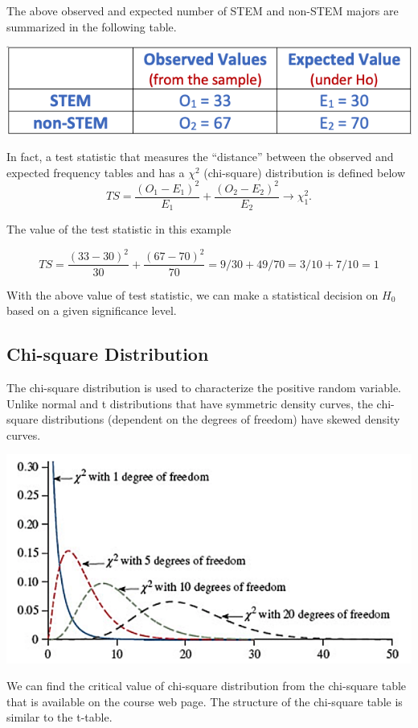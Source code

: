 \documentclass[
]{book}
\begin{document}
The above observed and expected number of STEM and non-STEM majors are summarized in the following table.

\begin{center}\includegraphics[width=0.5\linewidth]{week13/example01-ExpObsTable} \end{center}

In fact, a test statistic that measures the ``distance'' between the observed and expected frequency tables and has a \(\chi^2\) (chi-square) distribution is defined below
\[
TS = \frac{(O_1 - E_1)^2}{E_1} + \frac{(O_2 - E_2)^2}{E_2} \to \chi_1^2.
\]

The value of the test statistic in this example

\[TS = \frac{(33-30)^2}{30} + \frac{(67-70)^2}{70} = 9/30 + 49/70 = 3/10 + 7/10 = 1\]

With the above value of test statistic, we can make a statistical decision on \(H_0\) based on a given significance level.

\hypertarget{chi-square-distribution}{%
\subsection{Chi-square Distribution}\label{chi-square-distribution}}

The chi-square distribution is used to characterize the positive random variable. Unlike normal and t distributions that have symmetric density curves, the chi-square distributions (dependent on the degrees of freedom) have skewed density curves.

\begin{center}\includegraphics[width=0.6\linewidth]{week13/chisqDensity} \end{center}

We can find the critical value of chi-square distribution from the chi-square table that is available on the course web page. The structure of the chi-square table is similar to the t-table.
\end{document}
